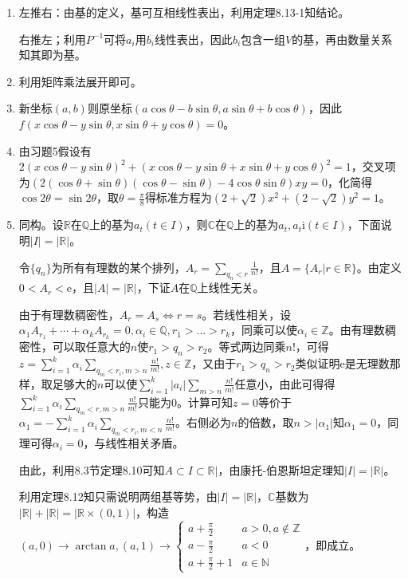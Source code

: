 \documentclass[a4paper,UTF8,fontset=windows]{ctexart}
\begin{document}
\begin{enumerate}
\item
左推右：由基的定义，基可互相线性表出，利用定理8.13-1知结论。

右推左；利用$P^{-1}$可将$a_i$用$b_i$线性表出，因此$b_i$包含一组$V$的基，再由数量关系知其即为基。

\item
利用矩阵乘法展开即可。

\item
新坐标$(a,b)$则原坐标$(a\cos\theta-b\sin\theta,a\sin\theta+b\cos\theta)$，因此$f(x\cos\theta-y\sin\theta,x\sin\theta+y\cos\theta)=0$。

\item
由习题5假设有$2(x\cos\theta-y\sin\theta)^2+(x\cos\theta-y\sin\theta+x\sin\theta+y\cos\theta)^2=1$，交叉项为$(2(\cos\theta+\sin\theta)(\cos\theta-\sin\theta)-4\cos\theta\sin\theta)xy=0$，化简得$\cos2\theta=\sin2\theta$，取$\theta=\frac{\pi}{8}$得标准方程为$(2+\sqrt2)x^2+(2-\sqrt2)y^2=1$。

\item
同构。设$\mathbb{R}$在$\mathbb{Q}$上的基为$a_t(t\in I)$，则$\mathbb{C}$在$\mathbb{Q}$上的基为$a_t,a_t\mathrm{i}(t\in I)$，下面说明$|I|=|\mathbb{R}|$。

令$\{q_n\}$为所有有理数的某个排列，$A_r=\sum_{q_n<r}\frac{1}{n!}$，且$A=\{A_r|r\in\mathbb{R}\}$。由定义$0<A_r<\mathrm{e}$，且$|A|=|\mathbb{R}|$，下证$A$在$\mathbb{Q}$上线性无关。

由于有理数稠密性，$A_r=A_s\Leftrightarrow r=s$。若线性相关，设$\alpha_1A_{r_1}+\cdots+\alpha_kA_{r_k}=0,\alpha_i\in\mathbb{Q},r_1>\dots>r_k$，同乘可以使$\alpha_i\in\mathbb{Z}$。由有理数稠密性，可以取任意大的$n$使$r_1>q_n>r_2$。等式两边同乘$n!$，可得$z=\sum_{i=1}^k\alpha_i\sum_{q_m<r_i,m>n}\frac{n!}{m!},z\in\mathbb{Z}$，又由于$r_1>q_n>r_2$类似证明$\mathrm{e}$是无理数那样，取足够大的$n$可以使$\sum_{i=1}^k|a_i|\sum_{m>n}\frac{n!}{m!}$任意小，由此可得得$\sum_{i=1}^k\alpha_i\sum_{q_m<r,m>n}\frac{n!}{m!}$只能为0。计算可知$z=0$等价于$\alpha_1=-\sum_{i=1}^k\alpha_i\sum_{q_m<r_i,m<n}\frac{n!}{m!}$。右侧必为$n$的倍数，取$n>|\alpha_1|$知$\alpha_1=0$，同理可得$\alpha_i=0$，与线性相关矛盾。

由此，利用8.3节定理8.10可知$A\subset I \subset\mathbb{R}|$，由康托-伯恩斯坦定理知$|I|=|\mathbb{R}|$。

利用定理8.12知只需说明两组基等势，由$|I|=|\mathbb{R}|$，$\mathbb{C}$基数为$|\mathbb{R}|+|\mathbb{R}|=|\mathbb{R}\times(0,1)|$，构造$(a,0)\to\arctan{a},(a,1)\to\begin{cases}a+\frac{\pi}{2}&a>0,a\notin\mathbb{Z}\\[1.5ex]a-\frac{\pi}{2}&a<0\\[1.5ex]a+\frac{\pi}{2}+1&a\in\mathbb{N}\end{cases}$，即成立。


\end{enumerate}
\end{document}
